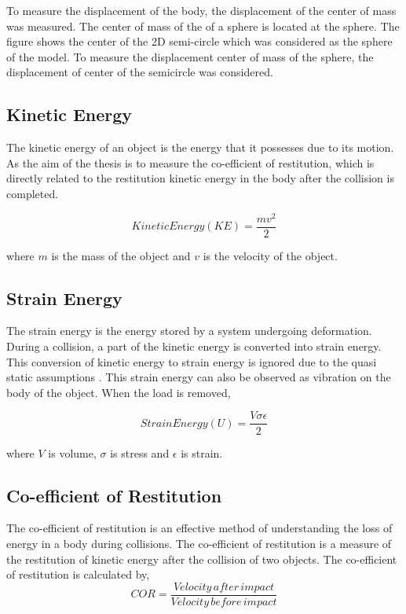 To measure the displacement of the body, the displacement of the center of mass was measured. The center of mass of the of a sphere is located at the sphere. The figure shows the center of the 2D semi-circle which was considered as the sphere of the model. To measure the displacement center of mass of the sphere, the displacement of center of the semicircle was considered.

\subsection{Kinetic Energy}

The kinetic energy of an object is the energy that it possesses due to its motion. As the aim of the thesis is to measure the co-efficient of restitution, which is directly related to the restitution kinetic energy in the body after the collision is completed.

\begin{equation}
Kinetic Energy(KE) = \frac{mv^{2}}{2}
\end{equation}
 
 where $m$ is the mass of the object and $v$ is the velocity of the object.

\subsection{Strain Energy}

The strain energy is the energy stored by a system undergoing deformation. During a collision, a part of the kinetic energy is converted into strain energy. This conversion of kinetic energy to strain energy is ignored due to the quasi static assumptions . This strain energy can also be observed as vibration on the body of the object. When the load is removed,

\begin{equation}
Strain Energy(U) = \frac{V\sigma\epsilon}{2}
\end{equation}

where $V$ is volume, $\sigma$ is stress and $\epsilon$ is strain.

\subsection{Co-efficient of Restitution}

The co-efficient of restitution is an effective method of understanding the loss of energy in a body during collisions. The co-efficient of restitution is a measure of the restitution of kinetic energy after the collision of two objects. 
The co-efficient of restitution is calculated by,
\begin{equation}
COR = \frac{Velocity\, after\, impact}{Velocity\, before\, impact}
\end{equation}
